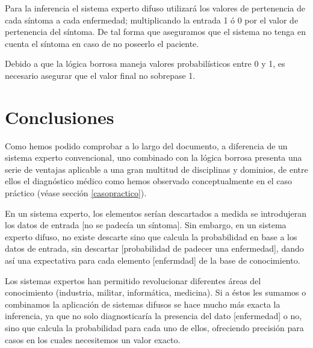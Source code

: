 \documentclass[a4paper, 11pt, titlepage]{article}
\begin{document}
        Para la inferencia el sistema experto difuso utilizará los valores de pertenencia de cada síntoma 
        a cada  enfermedad; multiplicando la entrada 1 ó 0 por el valor de pertenencia del síntoma. De tal 
        forma que aseguramos que el sistema no tenga en cuenta el síntoma en caso de no poseerlo el paciente.  

        Debido a que la lógica borrosa maneja valores probabilísticos entre 0 y 1, es necesario asegurar que el valor 
        final no sobrepase 1. 

\section{Conclusiones}

    Como hemos podido comprobar a lo largo del documento, a diferencia de un sistema experto convencional, uno 
    combinado con la lógica borrosa presenta una serie de ventajas aplicable a una gran multitud de disciplinas 
    y dominios, de entre ellos el diagnóstico médico como hemos observado conceptualmente en el caso práctico 
    (véase sección \ref{casopractico}).

    En un sistema experto, los elementos serían descartados a medida se introdujeran los datos de entrada [no 
    se padecía un síntoma]. Sin embargo, en un sistema experto difuso, no existe descarte sino que calcula 
    la probabilidad en base a los datos de entrada, sin descartar [probabilidad de padecer una enfermedad], dando 
    así una expectativa para cada elemento [enfermdad] de la base de conocimiento.
    
    Los sistemas expertos han permitido revolucionar diferentes áreas del conocimiento  (industria, militar, informática,
    medicina). Si a éstos les sumamos o combinamos la aplicación de sistemas difusos se hace mucho más exacta la 
    inferencia, ya que no solo diagnosticaría la presencia del dato [enfermedad] o no, sino que calcula la probabilidad 
    para cada uno de ellos, ofreciendo precisión para casos en los cuales necesitemos un valor exacto.
\end{document}
